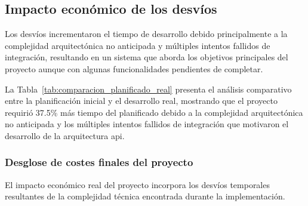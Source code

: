 \subsection{Impacto económico de los desvíos}
\label{subsec:impacto_economico_desvios}

Los desvíos incrementaron el tiempo de desarrollo debido principalmente a la complejidad arquitectónica no anticipada y múltiples intentos fallidos de integración, resultando en un sistema que aborda los objetivos principales del proyecto aunque con algunas funcionalidades pendientes de completar.

\begin{table}[htbp!]
  \centering
  \caption{Comparación planificado vs. real del proyecto}
  \label{tab:comparacion_planificado_real}
\end{table}

La Tabla~\ref{tab:comparacion_planificado_real} presenta el análisis comparativo entre la planificación inicial y el desarrollo real, mostrando que el proyecto requirió 37.5\% más tiempo del planificado debido a la complejidad arquitectónica no anticipada y los múltiples intentos fallidos de integración que motivaron el desarrollo de la arquitectura \acrshort{api}.

\subsubsection{Desglose de costes finales del proyecto}
\label{subsubsec:costes_finales_proyecto}

El impacto económico real del proyecto incorpora los desvíos temporales resultantes de la complejidad técnica encontrada durante la implementación.

